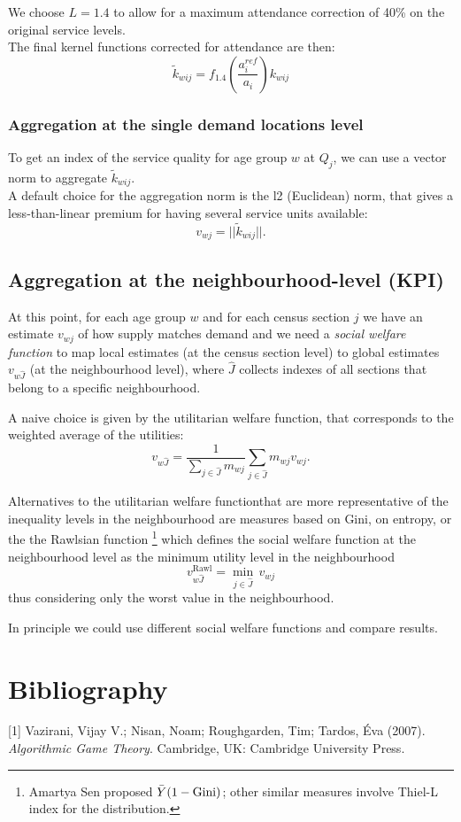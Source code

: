 \documentclass{article}
\begin{document}
We choose $L=1.4$ to allow for a maximum attendance correction of 40\% on the original service levels. \\
The final kernel functions corrected for attendance are then:
    \[\widetilde{k}_{wij} = f_{1.4}\left(\frac{a_i^{ref}}{a_i}\right)k_{wij}\]
    
\subsubsection{Aggregation at the single demand locations level}
To get an index of the service quality for age group $w$ at $Q_j$, we can use a vector norm to aggregate $\widetilde{k}_{wij}$.\\
A default choice for the aggregation norm is the l2 (Euclidean) norm, that gives a less-than-linear premium for having several service units available:
    \[v_{wj} = ||\widetilde{k}_{wij}||. \] 
\subsection{Aggregation at the neighbourhood-level (KPI)}
At this point, for each age group $w$ and for each census section $j$ we have an estimate $v_{wj}$ of how supply matches demand and we need a \textit{social welfare function} to map local estimates (at the census section level) to global estimates $v_{w\hat{J}}$ (at the neighbourhood level), where $\hat{J}$ collects indexes of all sections that belong to a specific neighbourhood.

A naive choice is given by the utilitarian welfare function, that corresponds to the weighted average of the utilities:
\[v_{w\hat{J}} = \frac{1}{\sum_{j \in \hat{J}} m_{wj}}\sum_{j \in \hat{J}} m_{wj} v_{wj}.
\]

Alternatives to the utilitarian welfare functionthat are more representative of the inequality levels in the neighbourhood are measures based on Gini, on entropy, or the the Rawlsian function \footnote{ Amartya Sen proposed $\Bar{Y}(1-\text{Gini})$; other similar measures involve Thiel-L index for the distribution.} which defines the social welfare function at the neighbourhood level as the minimum utility level in the neighbourhood
\[v^{\text{Rawl}}_{w\hat{J}} = \min_{j \in \hat{J}} \, v_{wj} \]
thus considering only the worst value in the neighbourhood.

In principle we could use different social welfare functions and compare results.

\section{Bibliography}
[1] Vazirani, Vijay V.; Nisan, Noam; Roughgarden, Tim; Tardos, Éva (2007). \textit{Algorithmic Game Theory}. Cambridge, UK: Cambridge University Press.
\end{document}
